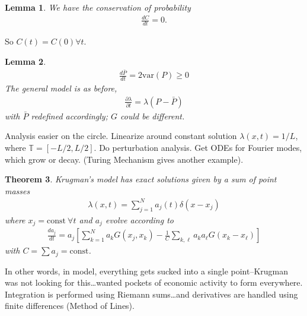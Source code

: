 \documentclass[12pt,reqno]{amsart}
\numberwithin{equation}{section}  %
\newcommand{\ci}{\mathbb{T}}
\newcommand{\p}{\partial}
\newtheorem{theorem}{Theorem}[section]
\newtheorem{lemma}[theorem]{Lemma}
\begin{document}
%
%
%
%
%
%
\begin{lemma}
%
We have the conservation of probability
%
\begin{equation*}
\begin{split}
\frac{dC}{dt} =0.
\end{split}
\end{equation*}
%
%
\label{lem:cons-prob}
\end{lemma}
%
%
So $C(t) = C(0) \forall t$. 
%
%
%
%
%
%
%                
%
%
%
%
\begin{lemma}
%
%
\begin{equation*}
\begin{split}
  \frac{d \bar{P}}{dt} = 2 \text{var}(P) \ge 0
\end{split}
\end{equation*}
%
%
The general model is as before, 
%
%
\begin{equation*}
\begin{split}
  \frac{\p \lambda}{ \p t} = \lambda (P - \bar{P}) 
\end{split}
\end{equation*}
%
%
with $\bar{P}$ redefined accordingly; $G$ could be different.
\label{lem:deriv-barP}
\end{lemma}
%
%
Analysis easier on the circle. Linearize around constant solution
$\lambda(x,t) = 1/L$, where $\ci = [-L/2, L/2]$. Do perturbation analysis.
Get ODEs for Fourier modes, which grow or decay. (Turing Mechanism gives another
example).
%
%
%
%
%
%
%
%
%
%
\begin{theorem}
Krugman's model has exact solutions given by a sum of point masses
%
%
\begin{equation*}
\begin{split}
  \lambda(x,t) = \sum_{j=1}^{N} a_{j}(t) \delta(x - x_{j})
\end{split}
\end{equation*}
%
%
where $x_{j} = \text{const} \ \forall t$ and $a_{j}$ evolve according to 
%
%
\begin{equation*}
\begin{split}
  \frac{d a_{j}}{dt} = a_{j}\left[ \sum_{k=1}^{N} a_{k} G(x_{j}, x_{k}) -
  \frac{1}{C} \sum_{k, \ell} a_{k}a_{\ell} G(x_{k} - x_{\ell}) \right] 
\end{split}
\end{equation*}
%
%
with $C = \sum a_{j} = \text{const}$.
\label{thm:main-theorem}
\end{theorem}
%
%
In other words, in model, everything gets sucked into a single point--Krugman
was not looking for this\ldots wanted pockets of economic activity to form
everywhere. Integration is performed using Riemann sums\ldots and derivatives
are handled using finite differences (Method of Lines). 
%
%
%
%
%
%
%
%
%
\end{document}
